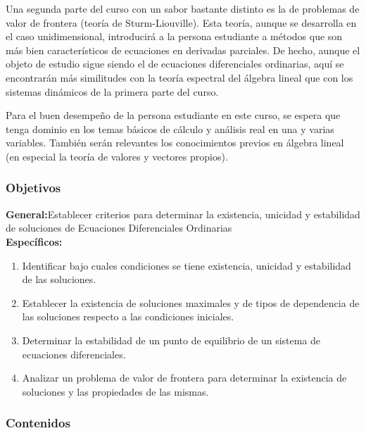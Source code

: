 \begin{refsection}
Una segunda parte del curso con un sabor bastante distinto es la de problemas de valor de frontera (teoría de Sturm-Liouville). Esta teoría, aunque se desarrolla en el caso unidimensional, introducirá a la persona estudiante a métodos que son más bien característicos de ecuaciones en derivadas parciales. De hecho, aunque el objeto de estudio sigue siendo el de ecuaciones diferenciales ordinarias, aquí se encontrarán más similitudes con la teoría espectral del álgebra lineal que con los sistemas dinámicos de la primera parte del curso.

Para el buen desempeño de la persona estudiante en este curso, se espera que tenga dominio en los temas básicos de cálculo y análisis real en una y varias variables. También serán relevantes los conocimientos previos en álgebra lineal (en especial la teoría de valores y vectores propios).



\subsubsection*{Objetivos}

\textbf{General:}Establecer criterios para determinar la existencia, unicidad y estabilidad de soluciones de Ecuaciones Diferenciales Ordinarias\\

\textbf{Específicos:}

\begin{enumerate}
\item Identificar bajo cuales condiciones se tiene existencia, unicidad y estabilidad de las soluciones.
\item Establecer la existencia de soluciones maximales y de tipos de dependencia de las soluciones respecto a las condiciones iniciales.
\item Determinar la estabilidad de un punto de equilibrio de un sistema de ecuaciones diferenciales.
\item Analizar un problema de valor de frontera para determinar la existencia de soluciones y las propiedades de las mismas.
\end{enumerate} 

\subsubsection*{Contenidos}




\end{refsection}
